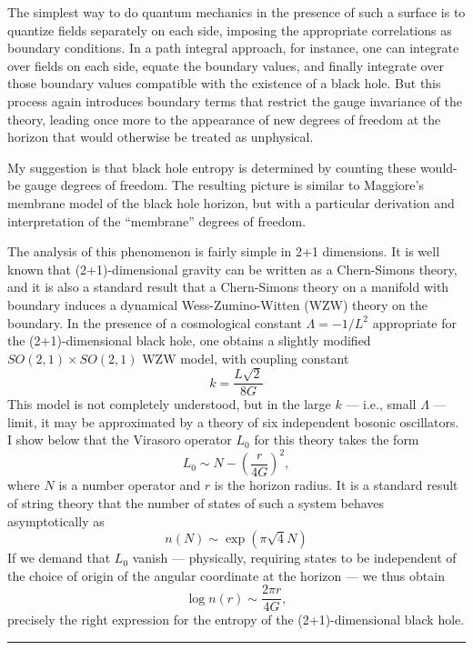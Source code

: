 \documentclass{article}
\begin{document}
The simplest way to do quantum mechanics in the presence of such a
surface is to quantize fields separately on each side, imposing the
appropriate correlations as boundary conditions. In a path integral
approach, for instance, one can integrate over fields on each side,
equate the boundary values, and finally integrate over those boundary
values compatible with the existence of a black hole. But this process
again introduces boundary terms that restrict the gauge invariance of
the theory, leading once more to the appearance of new degrees of
freedom at the horizon that would otherwise be treated as unphysical.

My suggestion is that black hole entropy is determined by counting these
would-be gauge degrees of freedom. The resulting picture is similar to
Maggiore's membrane model of the black hole horizon, but with a
particular derivation and interpretation of the ``membrane'' degrees of
freedom.

The analysis of this phenomenon is fairly simple in 2+1 dimensions. It
is well known that (2+1)-dimensional gravity can be written as a
Chern-Simons theory, and it is also a standard result that a
Chern-Simons theory on a manifold with boundary induces a dynamical
Wess-Zumino-Witten (WZW) theory on the boundary. In the presence of a
cosmological constant \(\Lambda = -1/L^2\) appropriate for the
(2+1)-dimensional black hole, one obtains a slightly modified
\(SO(2,1) \times SO(2,1)\) WZW model, with coupling constant
\[k = \frac{L\sqrt{2}}{8G}\] This model is not completely understood,
but in the large \(k\) --- i.e., small \(\Lambda\) --- limit, it may be
approximated by a theory of six independent bosonic oscillators. I show
below that the Virasoro operator \(L_0\) for this theory takes the form
\[L_0 \sim N -\left(\frac{r}{4G}\right)^2,\] where \(N\) is a number
operator and \(r\) is the horizon radius. It is a standard result of
string theory that the number of states of such a system behaves
asymptotically as \[n(N) \sim \exp(\pi \sqrt{4} N)\] If we demand that
\(L_0\) vanish --- physically, requiring states to be independent of the
choice of origin of the angular coordinate at the horizon --- we thus
obtain \[\log n(r) \sim \frac{2 \pi r}{4G},\] precisely the right
expression for the entropy of the (2+1)-dimensional black hole.

\begin{center}\rule{0.5\linewidth}{0.5pt}\end{center}
\end{document}
